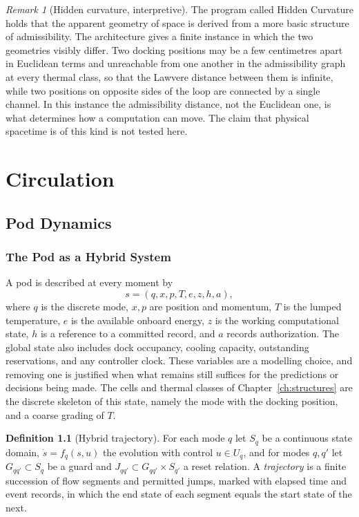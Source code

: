 \documentclass[11pt,openany]{book}
\theoremstyle{plain}
\theoremstyle{definition}
\newtheorem{definition}[theorem]{Definition}
\theoremstyle{remark}
\newtheorem{remark}[theorem]{Remark}
\begin{document}
\begin{remark}[Hidden curvature, interpretive]
The program called Hidden Curvature holds that the apparent geometry of space is derived from a more basic structure of admissibility. The architecture gives a finite instance in which the two geometries visibly differ. Two docking positions may be a few centimetres apart in Euclidean terms and unreachable from one another in the admissibility graph at every thermal class, so that the Lawvere distance between them is infinite, while two positions on opposite sides of the loop are connected by a single channel. In this instance the admissibility distance, not the Euclidean one, is what determines how a computation can move. The claim that physical spacetime is of this kind is not tested here.
\end{remark}
\part{Circulation}

\chapter{Pod Dynamics}
\label{ch:pod}

\section{The Pod as a Hybrid System}

A pod is described at every moment by
\[
s=(q,x,p,T,e,z,h,a),
\]
where $q$ is the discrete mode, $x,p$ are position and momentum, $T$ is the lumped temperature, $e$ is the available onboard energy, $z$ is the working computational state, $h$ is a reference to a committed record, and $a$ records authorization. The global state also includes dock occupancy, cooling capacity, outstanding reservations, and any controller clock. These variables are a modelling choice, and removing one is justified when what remains still suffices for the predictions or decisions being made. The cells and thermal classes of Chapter~\ref{ch:structures} are the discrete skeleton of this state, namely the mode with the docking position, and a coarse grading of $T$.

\begin{definition}[Hybrid trajectory]
For each mode $q$ let $S_q$ be a continuous state domain, $\dot s=f_q(s,u)$ the evolution with control $u\in U_q$, and for modes $q,q'$ let $G_{qq'}\subset S_q$ be a guard and $J_{qq'}\subset G_{qq'}\times S_{q'}$ a reset relation. A \emph{trajectory} is a finite succession of flow segments and permitted jumps, marked with elapsed time and event records, in which the end state of each segment equals the start state of the next.
\end{definition}
\end{document}
